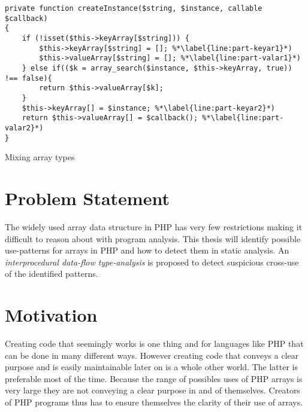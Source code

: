 




\begin{program}
\centering 
\begin{lstlisting}
private function createInstance($string, $instance, callable $callback)
{
    if (!isset($this->keyArray[$string])) {
        $this->keyArray[$string] = []; %*\label{line:part-keyar1}*)
        $this->valueArray[$string] = []; %*\label{line:part-valar1}*)
    } else if(($k = array_search($instance, $this->keyArray, true)) !== false){
        return $this->valueArray[$k];
    }
    $this->keyArray[] = $instance; %*\label{line:part-keyar2}*)
    return $this->valueArray[] = $callback(); %*\label{line:part-valar2}*)
}
\end{lstlisting}
\caption{Mixing array types}
\end{program}

\section{Problem Statement}
The widely used array data structure in PHP has very few restrictions making it difficult to reason about with program analysis. This thesis will identify possible use-patterns for arrays in PHP and how to detect them in static analysis. An \emph{interprocedural data-flow type-analysis} is proposed to detect suspicious cross-use of the identified patterns.

\section{Motivation}
Creating code that seemingly works is one thing and for languages like PHP that can be done in many different ways. However creating code that conveys a clear purpose and is easily maintainable later on is a whole other world. The latter is preferable most of the time. Because the range of possibles uses of PHP arrays is very large they are not conveying a clear purpose in and of themselves. Creators of PHP programs thus has to ensure themselves the clarity of their use of arrays. 

